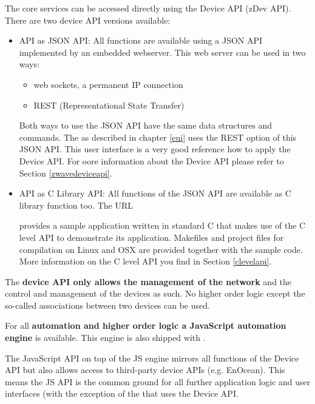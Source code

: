 The \zwave core services can be accessed directly using the \zwave Device API (zDev API). 
There are two \zwave device API versions available:
\begin{itemize}
\item \zwave API as JSON API: All functions are available using a JSON API implemented 
by an embedded webserver. This web server can be used in two ways:
\begin{itemize}
\item web sockets, a permanent IP connection
\item REST (Representational State Transfer)
\end{itemize}
Both ways to use the JSON API have the same data structures and commands. The 
\zweui as described in chapter \ref{eui} uses the REST option of this JSON API. This user 
interface is a very good reference how to apply the \zwave Device API. For oore 
information about the \zwave Device API please refer to Section \ref{zwavedeviceapi}.

\item \zwave API as C Library API: All functions of the JSON API are available as C 
library function too. The URL


provides a sample application written in standard C that makes use of the C level 
API to demonstrate its application. Makefiles and project files for compilation on 
Linux and OSX are provided together with the sample code. More information on the C 
level API you find in Section \ref{clevelapi}.

\end{itemize}


The \textbf{\zwave device API only allows the management of the \zwave network} and 
the control and management of the devices as such. No higher order logic except the 
so-called \zwave associations between two \zwave devices can be used.

For all \textbf{automation and higher order logic a JavaScript automation engine} 
is available. This engine is also shipped with \zway.

The JavaScript API on top of the JS engine mirrors all functions of the \zwave Device API 
but also allows access to third-party  device APIs (e.g. EnOcean). This means the JS API 
is the common ground for all further application logic and user interfaces (with the 
exception of the \zweui that uses the \zwave Device API.

